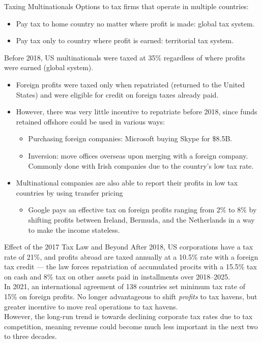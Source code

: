 \documentclass[10pt]{extarticle}
\begin{document}
  \begin{problem}{Taxing Multinationals}
    Options to tax firms that operate in multiple countries:
    \begin{itemize}
      \item Pay tax to home country no matter where profit is made: global tax system.
      \item Pay tax only to country where profit is earned: territorial tax system.
    \end{itemize}
    Before 2018, US multinationals were taxed at 35\% regardless of where profits were earned (global system).
    \begin{itemize}
      \item Foreign profits were taxed only when repatriated (returned to the United States) and were eligible for credit on foreign taxes already paid.
      \item However, there was very little incentive to repatriate before 2018, since funds retained offshore could be used in various ways:
        \begin{itemize}
          \item Purchasing foreign companies: Microsoft buying Skype for \$8.5B.
          \item Inversion: move offices overseas upon merging with a foreign company. Commonly done with Irish companies due to the country's low tax rate.
        \end{itemize}
      \item Multinational companies are also able to report their profits in low tax countries by using transfer pricing
        \begin{itemize}
          \item Google pays an effective tax on foreign profits ranging from 2\% to 8\% by shifting profits between Ireland, Bermuda, and the Netherlands in a way to make the income stateless.
        \end{itemize}
    \end{itemize}
  \end{problem}
  \begin{problem}{Effect of the 2017 Tax Law and Beyond}
    After 2018, US corporations have a tax rate of 21\%, and profits abroad are taxed annually at a 10.5\% rate with a foreign tax credit --- the law forces repatriation of accumulated procits with a 15.5\% tax on cash and 8\% tax on other assets paid in installments over 2018--2025.\\

    In 2021, an international agreement of 138 countries set minimum tax rate of 15\% on foreign profits. No longer advantageous to shift \textit{profits} to tax havens, but greater incentive to move real operations to tax havens.\\

    However, the long-run trend is towards declining corporate tax rates due to tax competition, meaning revenue could become much less important in the next two to three decades.
  \end{problem}
\end{document}
